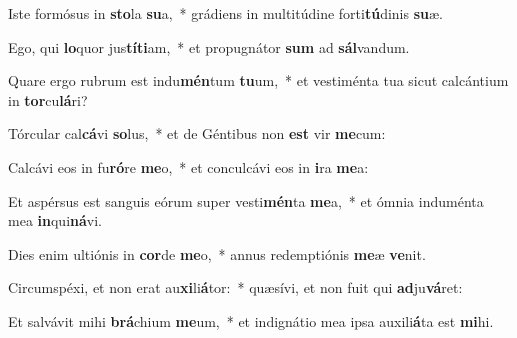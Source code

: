 \item Iste formósus in \textbf{sto}la \textbf{su}a,~* grádiens in multitúdine forti\textbf{tú}dinis \textbf{su}æ.
\item Ego, qui \textbf{lo}quor jus\textbf{tí}\textbf{ti}am,~* et propugnátor \textbf{sum} ad \textbf{sál}vandum.
\item Quare ergo rubrum est indu\textbf{mén}tum \textbf{tu}um,~* et vestiménta tua sicut calcántium in \textbf{tor}cu\textbf{lá}ri?
\item Tórcular cal\textbf{cá}vi \textbf{so}lus,~* et de Géntibus non \textbf{est} vir \textbf{me}cum:
\item Calcávi eos in fu\textbf{ró}re \textbf{me}o,~* et conculcávi eos in \textbf{i}ra \textbf{me}a:
\item Et aspérsus est sanguis eórum super vesti\textbf{mén}ta \textbf{me}a,~* et ómnia induménta mea \textbf{in}qui\textbf{ná}vi.
\item Dies enim ultiónis in \textbf{cor}de \textbf{me}o,~* annus redemptiónis \textbf{me}æ \textbf{ve}nit.
\item Circumspéxi, et non erat au\textbf{xi}li\textbf{á}tor:~* quæsívi, et non fuit qui \textbf{ad}ju\textbf{vá}ret:
\item Et salvávit mihi \textbf{brá}chium \textbf{me}um,~* et indignátio mea ipsa auxili\textbf{á}ta est \textbf{mi}hi.
